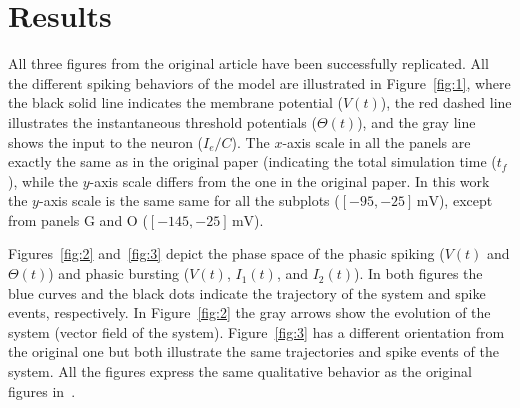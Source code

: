 \documentclass[10pt,a4paper,onecolumn]{article}
\newcommand{\Rm}[1]{\mathrm{#1}}
\begin{document}
\clearpage

\section{Results}\label{results}

All three figures from the original article have been successfully replicated.
All the different spiking behaviors of the model are illustrated in 
Figure~\ref{fig:1}, where the black solid line indicates the membrane potential
($V(t)$), the red dashed line illustrates the instantaneous threshold potentials
($\Theta(t)$), and the gray line shows the input to the neuron ($I_e/C$). 
The $x$-axis scale in all the panels are exactly the same as in the original
paper (indicating the total simulation time ($t_f$), while the $y$-axis scale 
differs from the one in the original paper. In this work the $y$-axis scale
is the same same for all the subplots ($[-95, -25]\, \Rm{mV}$), except from
panels G and O ($[-145, -25]\, \Rm{mV}$).

Figures~\ref{fig:2} and~\ref{fig:3} depict the phase space of the phasic
spiking ($V(t)$ and $\Theta(t)$) and phasic bursting ($V(t)$,
$I_1(t)$, and $I_2(t)$). In both figures the blue curves and the black dots 
indicate the trajectory of the system and spike events, respectively.
In Figure~\ref{fig:2} the gray arrows show the evolution of the system
(vector field of the system). Figure~\ref{fig:3} has a different orientation 
from the original one but both illustrate the same trajectories and spike 
events of the system. 
All the figures express the same qualitative behavior as the original
figures in~\cite{mihalas:2009}.
\end{document}
